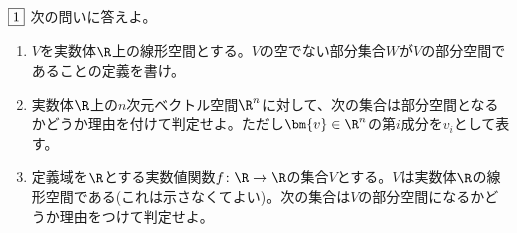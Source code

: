 \begin{tcolorbox} %
	$\fbox{1}$ 次の問いに答えよ。
\begin{enumerate}
	\item $V$を実数体$\R$上の線形空間とする。$V$の空でない部分集合$W$が$V$の部分空間であることの定義を書け。
	\item 実数体$\R$上の$n$次元ベクトル空間$\R^n$に対して、次の集合は部分空間となるかどうか理由を付けて判定せよ。ただし$\bm{v}\in \R^n$の第$i$成分を$v_i$として表す。

	\item 定義域を$\R$とする実数値関数$f\colon \R\to \R$の集合$V$とする。$V$は実数体$\R$の線形空間である(これは示さなくてよい)。次の集合は$V$の部分空間になるかどうか理由をつけて判定せよ。
\end{enumerate}
\end{tcolorbox}

